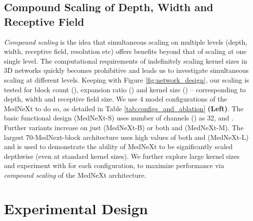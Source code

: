 \documentclass[runningheads]{llncs}
\begin{document}
\subsection{Compound Scaling of Depth, Width and Receptive Field}
\label{sec:scaling}
\textit{Compound scaling} \cite{tan2019efficientnet} is the idea that simultaneous scaling on multiple levels (depth, width, receptive field, resolution etc) offers benefits beyond that of scaling at one single level. The computational requirements of indefinitely scaling kernel sizes in 3D networks quickly becomes prohibitive and leads us to investigate simultaneous scaling at different levels. Keeping with Figure \ref{fig:network_design}, our scaling is tested for block count (), expansion ratio () and kernel size () --  corresponding to depth, width and receptive field size. We use 4 model configurations of the MedNeXt to do so, as detailed in Table \ref{tab:configs_and_ablation} \textbf{(Left)}. The basic functional design (MedNeXt-S) uses number of channels () as 32,  and . Further variants increase on just  (MedNeXt-B) or both  and  (MedNeXt-M). The largest 70-MedNext-block architecture uses high values of both  and  (MedNeXt-L) and is used to demonstrate the ability of MedNeXt to be significantly scaled depthwise (even at standard kernel sizes). We further explore large kernel sizes and experiment with  for each configuration, to maximize performance via \textit{compound scaling} of the MedNeXt architecture.

\section{Experimental Design}
\end{document}
